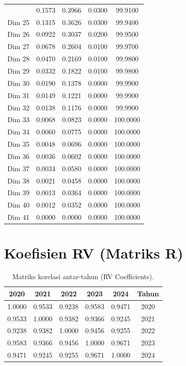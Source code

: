 \begin{table}[H]
\begin{tabular}{|c|c|c|c|c|}
{Dim 24 & 0.1573 & 0.3966 & 0.0300 & 99.9100 \\
Dim 25 & 0.1315 & 0.3626 & 0.0300 & 99.9400 \\
Dim 26 & 0.0922 & 0.3037 & 0.0200 & 99.9500 \\
Dim 27 & 0.0678 & 0.2604 & 0.0100 & 99.9700 \\
Dim 28 & 0.0470 & 0.2169 & 0.0100 & 99.9800 \\
Dim 29 & 0.0332 & 0.1822 & 0.0100 & 99.9800 \\
Dim 30 & 0.0190 & 0.1378 & 0.0000 & 99.9900 \\
Dim 31 & 0.0149 & 0.1221 & 0.0000 & 99.9900 \\
Dim 32 & 0.0138 & 0.1176 & 0.0000 & 99.9900 \\
Dim 33 & 0.0068 & 0.0823 & 0.0000 & 100.0000 \\
Dim 34 & 0.0060 & 0.0775 & 0.0000 & 100.0000 \\
Dim 35 & 0.0048 & 0.0696 & 0.0000 & 100.0000 \\
Dim 36 & 0.0036 & 0.0602 & 0.0000 & 100.0000 \\
Dim 37 & 0.0034 & 0.0580 & 0.0000 & 100.0000 \\
Dim 38 & 0.0021 & 0.0458 & 0.0000 & 100.0000 \\
Dim 39 & 0.0013 & 0.0364 & 0.0000 & 100.0000 \\
Dim 40 & 0.0012 & 0.0352 & 0.0000 & 100.0000 \\
Dim 41 & 0.0000 & 0.0000 & 0.0000 & 100.0000 \\
\hline
\end{tabular}
\end{table}
\vspace{0.5cm}
\section*{Koefisien RV (Matriks R)}
\begin{table}[H]
\centering
\caption{Matriks korelasi antar-tahun (RV Coefficients).} \label{tab:rvmatrix}
\begin{tabular}{|c|c|c|c|c|c|}
\hline
\textbf{2020} & \textbf{2021} & \textbf{2022} & \textbf{2023} & \textbf{2024} & \textbf{Tahun} \\
\hline
1.0000 & 0.9533 & 0.9238 & 0.9583 & 0.9471 & 2020 \\
0.9533 & 1.0000 & 0.9382 & 0.9366 & 0.9245 & 2021 \\
0.9238 & 0.9382 & 1.0000 & 0.9456 & 0.9255 & 2022 \\
0.9583 & 0.9366 & 0.9456 & 1.0000 & 0.9671 & 2023 \\
0.9471 & 0.9245 & 0.9255 & 0.9671 & 1.0000 & 2024 \\
\hline
\end{tabular}
\end{table}
\vspace{0.5cm}
